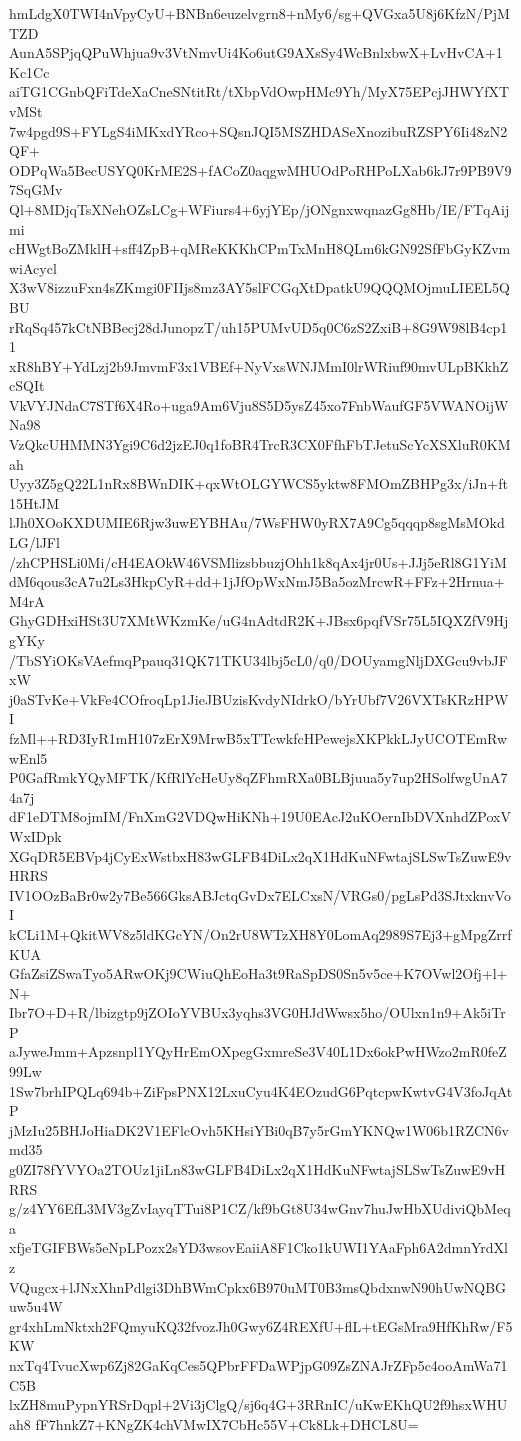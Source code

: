 hmLdgX0TWI4nVpyCyU+BNBn6euzelvgrn8+nMy6/sg+QVGxa5U8j6KfzN/PjMTZD
AunA5SPjqQPuWhjua9v3VtNmvUi4Ko6utG9AXsSy4WcBnlxbwX+LvHvCA+1Kc1Cc
aiTG1CGnbQFiTdeXaCneSNtitRt/tXbpVdOwpHMc9Yh/MyX75EPcjJHWYfXTvMSt
7w4pgd9S+FYLgS4iMKxdYRco+SQsnJQI5MSZHDASeXnozibuRZSPY6Ii48zN2QF+
ODPqWa5BecUSYQ0KrME2S+fACoZ0aqgwMHUOdPoRHPoLXab6kJ7r9PB9V97SqGMv
Ql+8MDjqTsXNehOZsLCg+WFiurs4+6yjYEp/jONgnxwqnazGg8Hb/IE/FTqAijmi
cHWgtBoZMklH+sff4ZpB+qMReKKKhCPmTxMnH8QLm6kGN92SfFbGyKZvmwiAcycl
X3wV8izzuFxn4sZKmgi0FIIjs8mz3AY5slFCGqXtDpatkU9QQQMOjmuLIEEL5QBU
rRqSq457kCtNBBecj28dJunopzT/uh15PUMvUD5q0C6zS2ZxiB+8G9W98lB4cp11
xR8hBY+YdLzj2b9JmvmF3x1VBEf+NyVxsWNJMmI0lrWRiuf90mvULpBKkhZcSQIt
VkVYJNdaC7STf6X4Ro+uga9Am6Vju8S5D5ysZ45xo7FnbWaufGF5VWANOijWNa98
VzQkcUHMMN3Ygi9C6d2jzEJ0q1foBR4TrcR3CX0FfhFbTJetuScYcXSXluR0KMah
Uyy3Z5gQ22L1nRx8BWnDIK+qxWtOLGYWCS5yktw8FMOmZBHPg3x/iJn+ft15HtJM
lJh0XOoKXDUMIE6Rjw3uwEYBHAu/7WsFHW0yRX7A9Cg5qqqp8sgMsMOkdLG/lJFl
/zhCPHSLi0Mi/cH4EAOkW46VSMlizsbbuzjOhh1k8qAx4jr0Us+JJj5eRl8G1YiM
dM6qous3cA7u2Ls3HkpCyR+dd+1jJfOpWxNmJ5Ba5ozMrcwR+FFz+2Hrnua+M4rA
GhyGDHxiHSt3U7XMtWKzmKe/uG4nAdtdR2K+JBsx6pqfVSr75L5IQXZfV9HjgYKy
/TbSYiOKsVAefmqPpauq31QK71TKU34lbj5cL0/q0/DOUyamgNljDXGcu9vbJFxW
j0aSTvKe+VkFe4COfroqLp1JieJBUzisKvdyNIdrkO/bYrUbf7V26VXTsKRzHPWI
fzMl++RD3IyR1mH107zErX9MrwB5xTTcwkfcHPewejsXKPkkLJyUCOTEmRwwEnl5
P0GafRmkYQyMFTK/KfRlYcHeUy8qZFhmRXa0BLBjuua5y7up2HSolfwgUnA74a7j
dF1eDTM8ojmIM/FnXmG2VDQwHiKNh+19U0EAcJ2uKOernIbDVXnhdZPoxVWxIDpk
XGqDR5EBVp4jCyExWstbxH83wGLFB4DiLx2qX1HdKuNFwtajSLSwTsZuwE9vHRRS
IV1OOzBaBr0w2y7Be566GksABJctqGvDx7ELCxsN/VRGs0/pgLsPd3SJtxknvVoI
kCLi1M+QkitWV8z5ldKGcYN/On2rU8WTzXH8Y0LomAq2989S7Ej3+gMpgZrrfKUA
GfaZsiZSwaTyo5ARwOKj9CWiuQhEoHa3t9RaSpDS0Sn5v5ce+K7OVwl2Ofj+l+N+
Ibr7O+D+R/lbizgtp9jZOIoYVBUx3yqhs3VG0HJdWwsx5ho/OUlxn1n9+Ak5iTrP
aJyweJmm+Apzsnpl1YQyHrEmOXpegGxmreSe3V40L1Dx6okPwHWzo2mR0feZ99Lw
1Sw7brhIPQLq694b+ZiFpsPNX12LxuCyu4K4EOzudG6PqtcpwKwtvG4V3foJqAtP
jMzIu25BHJoHiaDK2V1EFlcOvh5KHsiYBi0qB7y5rGmYKNQw1W06b1RZCN6vmd35
g0ZI78fYVYOa2TOUz1jiLn83wGLFB4DiLx2qX1HdKuNFwtajSLSwTsZuwE9vHRRS
g/z4YY6EfL3MV3gZvIayqTTui8P1CZ/kf9bGt8U34wGnv7huJwHbXUdiviQbMeqa
xfjeTGIFBWs5eNpLPozx2sYD3wsovEaiiA8F1Cko1kUWI1YAaFph6A2dmnYrdXlz
VQugcx+lJNxXhnPdlgi3DhBWmCpkx6B970uMT0B3msQbdxnwN90hUwNQBGuw5u4W
gr4xhLmNktxh2FQmyuKQ32fvozJh0Gwy6Z4REXfU+flL+tEGsMra9HfKhRw/F5KW
nxTq4TvucXwp6Zj82GaKqCes5QPbrFFDaWPjpG09ZsZNAJrZFp5c4ooAmWa71C5B
lxZH8muPypnYRSrDqpl+2Vi3jClgQ/sj6q4G+3RRnIC/uKwEKhQU2f9hsxWHUah8
fF7hnkZ7+KNgZK4chVMwIX7CbHc55V+Ck8Lk+DHCL8U=
